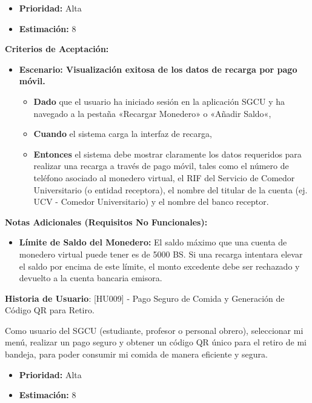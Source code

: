 \documentclass[12pt]{article}
\begin{document}
\begin{itemize}
    \item \textbf{Prioridad:} Alta
    \item \textbf{\textbf{Estimación:}} 8
\end{itemize}

\textbf{Criterios de Aceptación:}
\begin{itemize}
    \item \textbf{Escenario: Visualización exitosa de los datos de recarga por pago móvil.}
    \begin{itemize}
        \item \textbf{Dado} que el usuario ha iniciado sesión en la aplicación SGCU y ha navegado a la pestaña «Recargar Monedero» o «Añadir Saldo«,
        \item \textbf{Cuando} el sistema carga la interfaz de recarga,
        \item \textbf{Entonces} el sistema debe mostrar claramente los datos requeridos para realizar una recarga a través de pago móvil, tales como el número de teléfono asociado al monedero virtual, el RIF del Servicio de Comedor Universitario (o entidad receptora), el nombre del titular de la cuenta (ej. UCV - Comedor Universitario) y el nombre del banco receptor.
    \end{itemize}

\end{itemize}

\textbf{Notas Adicionales (Requisitos No Funcionales):}
\begin{itemize}
    \item \textbf{Límite de Saldo del Monedero:} El saldo máximo que una cuenta de monedero virtual puede tener es de 5000 BS. Si una recarga intentara elevar el saldo por encima de este límite, el monto excedente debe ser rechazado y devuelto a la cuenta bancaria emisora.
\end{itemize}

\textbf{Historia de Usuario}: [HU009] - Pago Seguro de Comida y Generación de Código QR para Retiro.

Como usuario del SGCU (estudiante, profesor o personal obrero), seleccionar mi menú, realizar un pago seguro y obtener un código QR único para el retiro de mi bandeja, para poder consumir mi comida de manera eficiente y segura.

\begin{itemize}
    \item \textbf{Prioridad:} Alta
    \item \textbf{\textbf{Estimación:}} 8
\end{itemize}
\end{document}

